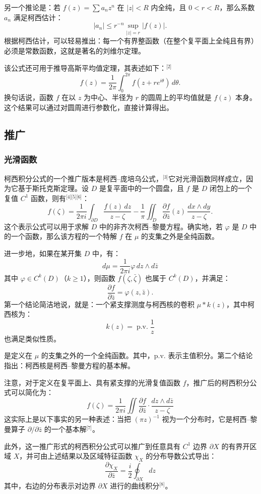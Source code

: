 另一个推论是：若 $f(z) = \sum a_n z^n$ 在 $|z| < R$ 内全纯，且 $0 < r < R$，那么系数 $a_n$ 满足柯西估计：
$$
|a_n| \leq r^{-n} \sup_{|z|=r} |f(z)|.~
$$
根据柯西估计，可以轻易推出：每一个有界整函数（在整个复平面上全纯且有界）必须是常数函数，这就是著名的刘维尔定理。

该公式还可用于推导高斯平均值定理，其表述如下：\(^\text{[2]}\)
$$
f(z) = \frac{1}{2\pi} \int_0^{2\pi} f(z + re^{i\theta})\, d\theta.~
$$
换句话说，函数 $f$ 在以 $z$ 为中心、半径为 $r$ 的圆周上的平均值就是 $f(z)$ 本身。这个结果可以通过对圆周进行参数化，直接计算得出。
\subsection{推广}
\subsubsection{光滑函数}
柯西积分公式的一个推广版本是柯西–庞培乌公式，\(^\text{[3]}\)它对光滑函数同样成立，因为它基于斯托克斯定理。设 $D$ 是复平面中的一个圆盘，且 $f$ 是 $D$ 闭包上的一个复值 $C^1$ 函数，则有\(^\text{[4][5][6]}\)：
$$
f(\zeta) = \frac{1}{2\pi i} \int_{\partial D} \frac{f(z)\,dz}{z - \zeta} - \frac{1}{\pi} \iint_D \frac{\partial f}{\partial \bar{z}}(z)\,\frac{dx \wedge dy}{z - \zeta}.~
$$
这个表示公式可以用于求解 $D$ 中的非齐次柯西–黎曼方程。确实地，若 $\varphi$ 是 $D$ 中的一个函数，那么该方程的一个特解 $f$ 在 $\mu$ 的支集之外是全纯函数。

进一步地，如果在某开集 $D$ 中，有：
$$
d\mu = \frac{1}{2\pi i} \varphi\, dz \wedge d\bar{z}~
$$
其中 $\varphi \in C^k(D)$（$k \geq 1$），则函数 $f(\zeta, \bar{\zeta})$ 也属于 $C^k(D)$，并满足：
$$
\frac{\partial f}{\partial \bar{z}} = \varphi(z, \bar{z}).~
$$
第一个结论简洁地说，就是：一个紧支撑测度与柯西核的卷积 $\mu * k(z)$，其中柯西核为：
$$
k(z) = \operatorname{p.v.} \frac{1}{z}~
$$
也满足类似性质。

是定义在 $\mu$ 的支集之外的一个全纯函数。其中，p.v. 表示主值积分。第二个结论指出：柯西核是柯西–黎曼方程的基本解。

注意，对于定义在复平面上、具有紧支撑的光滑复值函数 $f$，推广后的柯西积分公式可以简化为：
$$
f(\zeta) = \frac{1}{2\pi i} \iint \frac{\partial f}{\partial \bar{z}} \cdot \frac{dz \wedge d\bar{z}}{z - \zeta}~
$$
这实际上是以下事实的另一种表述：当把 $(\pi z)^{-1}$ 视为一个分布时，它是柯西–黎曼算子 $\partial / \partial \bar{z}$ 的一个基本解\(^\text{[7]}\)。

此外，这一推广形式的柯西积分公式可以推广到任意具有 $C^1$ 边界 $\partial X$ 的有界开区域 $X$，并可由上述结果以及区域特征函数 $\chi_X$ 的分布导数公式导出：
$$
\frac{\partial \chi_X}{\partial \bar{z}} = \frac{i}{2} \oint_{\partial X} dz~
$$
其中，右边的分布表示对边界 $\partial X$ 进行的曲线积分\(^\text{[8]}\)。

